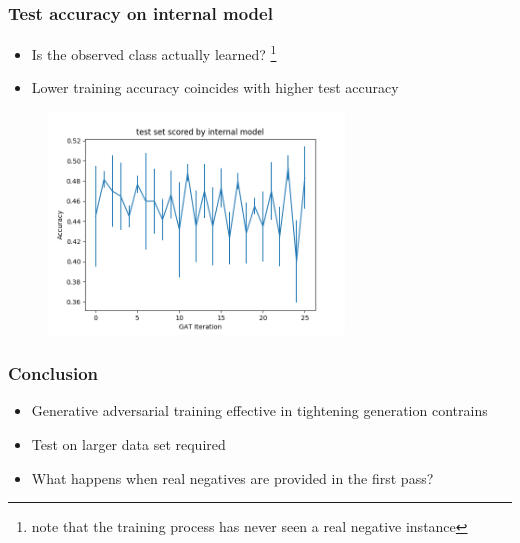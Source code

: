 \documentclass{beamer}
\begin{document}
\begin{frame}
    \frametitle{Test accuracy on internal model}
    \begin{itemize}
        \item Is the observed class actually learned?
            \footnote{note that the training process has never seen a real negative instance}
        \item Lower training accuracy coincides with higher test accuracy
    \end{itemize}

   \begin{figure}[ht]
        \centering
        \includegraphics[width=0.70\textwidth]{images/eval3.png}
    \end{figure}
\end{frame}



\begin{frame}
    \frametitle{Conclusion}
    
    \begin{itemize}
        \item  Generative adversarial training effective in tightening 
            generation contrains
        \item Test on larger data set required
        \item What happens when real negatives are provided in the first pass?
    \end{itemize}

\end{frame}
\end{document}
